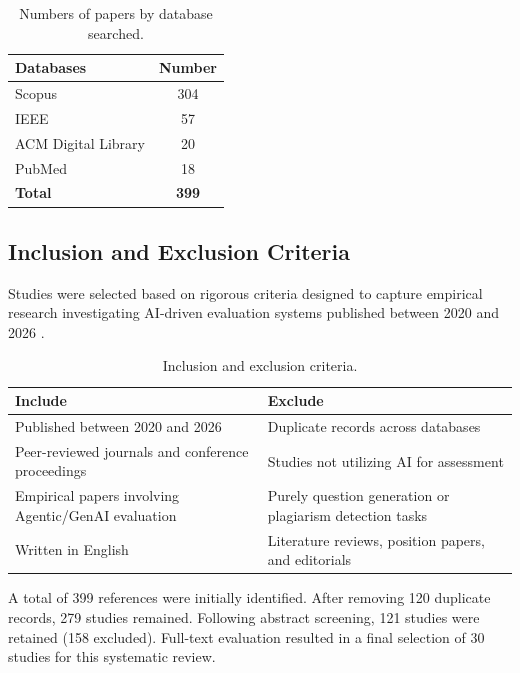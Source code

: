 \documentclass[11pt,a4paper]{article}
\begin{document}
\begin{table}[H]
\centering
\caption{Numbers of papers by database searched.}
\label{tab:dbs}
\begin{tabular}{lc}
\toprule
\textbf{Databases} & \textbf{Number} \\
\midrule
Scopus & 304 \\
IEEE & 57 \\
ACM Digital Library & 20 \\
PubMed & 18 \\
\textbf{Total} & \textbf{399} \\
\bottomrule
\end{tabular}
\end{table}

\subsection{Inclusion and Exclusion Criteria}
Studies were selected based on rigorous criteria designed to capture empirical research investigating AI-driven evaluation systems published between 2020 and 2026 \cite{P013}.

\begin{table}[H]
\centering
\caption{Inclusion and exclusion criteria.}
\label{tab:criteria}
\begin{tabularx}{\textwidth}{XX}
\toprule
\textbf{Include} & \textbf{Exclude} \\
\midrule
Published between 2020 and 2026 & Duplicate records across databases \\
Peer-reviewed journals and conference proceedings & Studies not utilizing AI for assessment \\
Empirical papers involving Agentic/GenAI evaluation & Purely question generation or plagiarism detection tasks \\
Written in English & Literature reviews, position papers, and editorials \\
\bottomrule
\end{tabularx}
\end{table}

A total of 399 references were initially identified. After removing 120 duplicate records, 279 studies remained. Following abstract screening, 121 studies were retained (158 excluded). Full-text evaluation resulted in a final selection of 30 studies for this systematic review.
\end{document}
